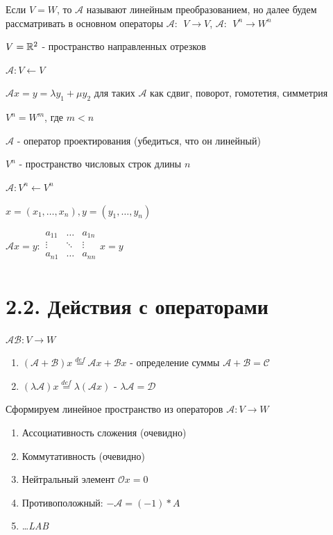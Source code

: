 \documentclass[12pt]{article}
\begin{document}
    \Nota Если $V = W$, то $\mathcal{A}$ называют линейным преобразованием, но далее будем рассматривать в основном операторы $\mathcal{A}: \ \ V \rightarrow V$, $\mathcal{A}: \ \ V^n \rightarrow W^n$



     $V = \mathbb{R}^2$ - пространство направленных отрезков

    $\mathcal{A}: V \leftarrow V$

    $\mathcal{A}x = y = \lambda y_1 + \mu y_2$ для таких $\mathcal{A}$ как сдвиг, поворот, гомотетия, симметрия

     $V^n = W^m$, где $m < n$

    $\mathcal{A}$ - оператор проектирования (убедиться, что он линейный)

     $V^n$ - пространство числовых строк длины $n$

    $\mathcal{A}: V^n \leftarrow V^n$

    $x = (x_1, \dots, x_n), y = (y_1, \dots, y_n)$

    $\mathcal{A}x = y : \begin{array}{|ccc|}
    a_{11} & \ldots & a_{1n}\\
    \vdots & \ddots & \vdots\\
    a_{n1} & \ldots & a_{nn}\\
    \end{array}x = y$


    \section{2.2. Действия с операторами}

    \Def $\mathcal{A}\mathcal{B}: V \rightarrow W$

    \begin{enumerate}
        \item $(\mathcal{A} + \mathcal{B})x \stackrel{def}{=} \mathcal{A}x + \mathcal{B}x$ - определение суммы $\mathcal{A} + \mathcal{B} = \mathcal{C}$
        \item $(\lambda\mathcal{A})x \stackrel{def}{=} \lambda(\mathcal{A}x)$ - $\lambda\mathcal{A} = \mathcal{D}$
    \end{enumerate}

    \Nota Сформируем линейное пространство из операторов $\mathcal{A}: V \rightarrow W$

    \begin{enumerate}
        \item Ассоциативность сложения (очевидно)
        \item Коммутативность (очевидно)
        \item Нейтральный элемент $\mathcal{O}x = 0$
        \item Противоположный: $-\mathcal{A} = (-1) * A$
        \item \dots \textit{LAB}
    \end{enumerate}
\end{document}
